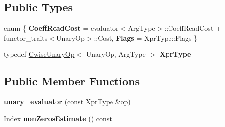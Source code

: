 \subsection*{Public Types}
\begin{DoxyCompactItemize}
\item 
\mbox{\label{struct_eigen_1_1internal_1_1unary__evaluator_3_01_cwise_unary_op_3_01_unary_op_00_01_arg_type_01_4_00_01_iterator_based_01_4_a6f5d25550be1c1c3b0a4c764026a355f}} 
enum \{ {\bfseries Coeff\+Read\+Cost} = evaluator$<$Arg\+Type$>$\+::Coeff\+Read\+Cost + functor\+\_\+traits$<$Unary\+Op$>$\+::Cost, 
{\bfseries Flags} = Xpr\+Type\+::Flags
 \}
\item 
\mbox{\label{struct_eigen_1_1internal_1_1unary__evaluator_3_01_cwise_unary_op_3_01_unary_op_00_01_arg_type_01_4_00_01_iterator_based_01_4_a80a61e0886f598aa4886d78d12c69d68}} 
typedef \mbox{\hyperlink{class_eigen_1_1_cwise_unary_op}{Cwise\+Unary\+Op}}$<$ Unary\+Op, Arg\+Type $>$ {\bfseries Xpr\+Type}
\end{DoxyCompactItemize}
\subsection*{Public Member Functions}
\begin{DoxyCompactItemize}
\item 
\mbox{\label{struct_eigen_1_1internal_1_1unary__evaluator_3_01_cwise_unary_op_3_01_unary_op_00_01_arg_type_01_4_00_01_iterator_based_01_4_a0dff2d37c1bc909ad7a7ed74869808e1}} 
{\bfseries unary\+\_\+evaluator} (const \mbox{\hyperlink{class_eigen_1_1_cwise_unary_op}{Xpr\+Type}} \&op)
\item 
\mbox{\label{struct_eigen_1_1internal_1_1unary__evaluator_3_01_cwise_unary_op_3_01_unary_op_00_01_arg_type_01_4_00_01_iterator_based_01_4_a7d919e9d0ad383413d5f942d4562e453}} 
Index {\bfseries non\+Zeros\+Estimate} () const
\end{DoxyCompactItemize}
